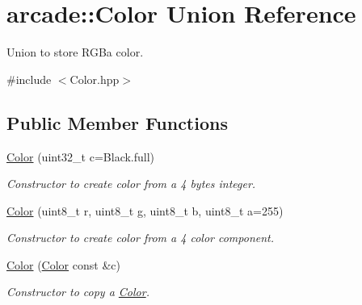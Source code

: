 \hypertarget{unionarcade_1_1Color}{}\section{arcade\+:\+:Color Union Reference}
\label{unionarcade_1_1Color}


Union to store R\+G\+Ba color.  




{\ttfamily \#include $<$Color.\+hpp$>$}

\subsection*{Public Member Functions}
\begin{DoxyCompactItemize}
\item 
\hyperlink{unionarcade_1_1Color_a053784aa4df3917111e2717d74fa3d85}{Color} (uint32\+\_\+t c=Black.\+full)
\begin{DoxyCompactList}\small\item\em Constructor to create color from a 4 bytes integer. \end{DoxyCompactList}\item 
\hyperlink{unionarcade_1_1Color_acf519d304c0dae64e28b976414af0753}{Color} (uint8\+\_\+t r, uint8\+\_\+t g, uint8\+\_\+t b, uint8\+\_\+t a=255)
\begin{DoxyCompactList}\small\item\em Constructor to create color from a 4 color component. \end{DoxyCompactList}\item 
\hyperlink{unionarcade_1_1Color_a25345f417c09d13da1b20f5a0f030eec}{Color} (\hyperlink{unionarcade_1_1Color}{Color} const \&c)
\begin{DoxyCompactList}\small\item\em Constructor to copy a \hyperlink{unionarcade_1_1Color}{Color}. \end{DoxyCompactList}\end{DoxyCompactItemize}
